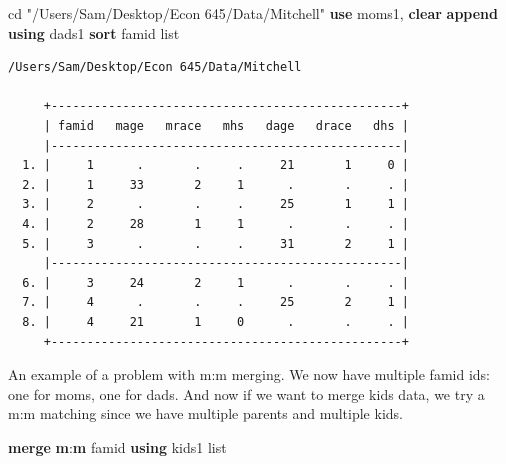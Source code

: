 \documentclass[
]{book}
\newenvironment{Shaded}{\begin{snugshade}}{\end{snugshade}}
\newcommand{\FunctionTok}[1]{\textcolor[rgb]{0.13,0.29,0.53}{\textbf{#1}}}
\newcommand{\KeywordTok}[1]{\textcolor[rgb]{0.13,0.29,0.53}{\textbf{#1}}}
\newcommand{\NormalTok}[1]{#1}
\newcommand{\OtherTok}[1]{\textcolor[rgb]{0.56,0.35,0.01}{#1}}
\newcommand{\StringTok}[1]{\textcolor[rgb]{0.31,0.60,0.02}{#1}}
\begin{document}
\begin{Shaded}
\begin{Highlighting}[]
\NormalTok{cd }\StringTok{"/Users/Sam/Desktop/Econ 645/Data/Mitchell"}
\KeywordTok{use}\NormalTok{ moms1, }\KeywordTok{clear}
\KeywordTok{append} \KeywordTok{using}\NormalTok{ dads1}
\KeywordTok{sort}\NormalTok{ famid}
\OtherTok{list}
\end{Highlighting}
\end{Shaded}

\begin{verbatim}
/Users/Sam/Desktop/Econ 645/Data/Mitchell

     +-------------------------------------------------+
     | famid   mage   mrace   mhs   dage   drace   dhs |
     |-------------------------------------------------|
  1. |     1      .       .     .     21       1     0 |
  2. |     1     33       2     1      .       .     . |
  3. |     2      .       .     .     25       1     1 |
  4. |     2     28       1     1      .       .     . |
  5. |     3      .       .     .     31       2     1 |
     |-------------------------------------------------|
  6. |     3     24       2     1      .       .     . |
  7. |     4      .       .     .     25       2     1 |
  8. |     4     21       1     0      .       .     . |
     +-------------------------------------------------+
\end{verbatim}

An example of a problem with m:m merging.
We now have multiple famid ids: one for moms, one for dads. And now if we want to merge kids data, we try a m:m matching since we have multiple parents and multiple kids.

\begin{Shaded}
\begin{Highlighting}[]
\KeywordTok{merge} \FunctionTok{m}\NormalTok{:}\FunctionTok{m}\NormalTok{ famid }\KeywordTok{using}\NormalTok{ kids1}
\OtherTok{list}
\end{Highlighting}
\end{Shaded}
\end{document}
